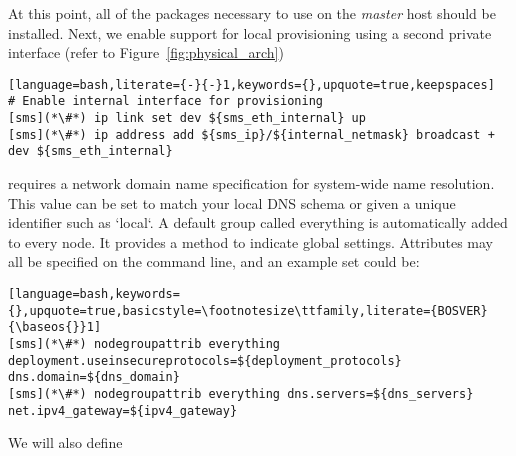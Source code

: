 At this point, all of the packages necessary to use \Confluent{} on the {\em master}
host should be installed. Next, we enable support for local provisioning using
a second private interface (refer to Figure~\ref{fig:physical_arch})

\begin{lstlisting}[language=bash,literate={-}{-}1,keywords={},upquote=true,keepspaces]
# Enable internal interface for provisioning
[sms](*\#*) ip link set dev ${sms_eth_internal} up
[sms](*\#*) ip address add ${sms_ip}/${internal_netmask} broadcast + dev ${sms_eth_internal}

\end{lstlisting}


\noindent \Confluent{} requires a network domain name specification for system-wide name
resolution. This value can be set to match your local DNS schema or given a
unique identifier such as `local`. A default group called everything is 
automatically added to every node. It provides a method to indicate global settings.
Attributes may all be specified on the command line, and an example set could be:

\begin{lstlisting}[language=bash,keywords={},upquote=true,basicstyle=\footnotesize\ttfamily,literate={BOSVER}{\baseos{}}1]
[sms](*\#*) nodegroupattrib everything deployment.useinsecureprotocols=${deployment_protocols} dns.domain=${dns_domain} 
[sms](*\#*) nodegroupattrib everything dns.servers=${dns_servers} net.ipv4_gateway=${ipv4_gateway}
\end{lstlisting}

\noindent We will also define 